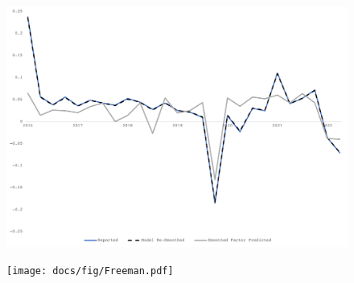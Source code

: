 \documentclass[10pt, compress]{beamer}
\begin{document}
\begin{frame}[fragile]

\begin{figure}
	\centering
	\includegraphics[width=1.04\linewidth]{docs/fig/RockpointV.pdf}\\
    \bigskip

\end{figure}
\end{frame}


\begin{frame}[fragile]

\begin{figure}
	\centering
	\texttt{[image: docs/fig/Freeman.pdf]}\\
    \bigskip

\end{figure}

\end{frame}
\end{document}
